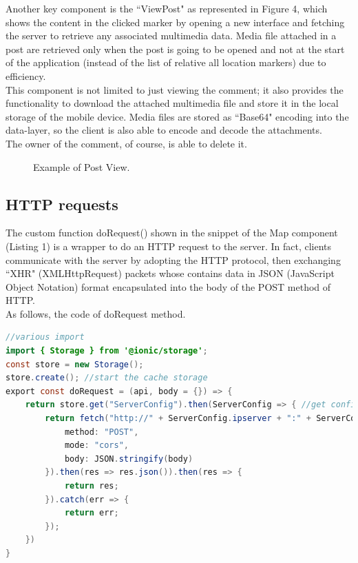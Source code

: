 \documentclass[conference]{IEEEtran}
\begin{document}
Another key component is the ``ViewPost" as represented in Figure 4, which shows the content in the clicked marker by opening a new interface and fetching the server to retrieve any associated multimedia data.
Media file attached in a post are retrieved only when the post is going to be opened and not at the start of the application (instead of the list of relative all location markers) due  to efficiency.
\\
This component is not limited to just viewing the comment; it also provides the functionality to download the attached multimedia file and store it in the local storage of the mobile device.
Media files are stored as ``Base64" encoding into the data-layer, so the client is also able to encode and decode the attachments.
\\
The owner of the comment, of course, is able to delete it.

\begin{figure}[htbp]
\begin{center}
\end{center}
\caption{Example of Post View.}
\label{fig}
\end{figure}


\subsection{HTTP requests}

The custom function doRequest() shown in the snippet of the Map component (Listing 1) is a wrapper to do an HTTP request to the server.
In fact, clients communicate with the server by adopting the HTTP protocol, then exchanging ``XHR" (XMLHttpRequest) packets whose contains data in JSON (JavaScript Object Notation) format encapsulated into the body of the POST method of HTTP.
\\
As follows, the code of doRequest method.
\begin{lstlisting}[language=Java, caption=Method doRequest to fetch server]
//various import 
import { Storage } from '@ionic/storage';
const store = new Storage(); 
store.create(); //start the cache storage
export const doRequest = (api, body = {}) => {
    return store.get("ServerConfig").then(ServerConfig => { //get config from cache
        return fetch("http://" + ServerConfig.ipserver + ":" + ServerConfig.port + "/" + api, {
            method: "POST",
            mode: "cors",
            body: JSON.stringify(body)
        }).then(res => res.json()).then(res => {
            return res;
        }).catch(err => {
            return err;
        });
    })
}
\end{lstlisting}
\end{document}
